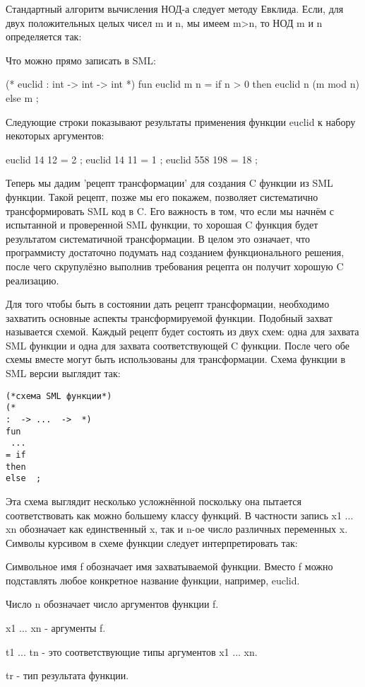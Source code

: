 Стандартный алгоритм вычисления НОД-а следует методу Евклида. Если, для двух положительных целых чисел m и n, мы имеем m>n, то НОД m и n определяется так:

Что можно прямо записать в SML:

(* euclid : int -> int -> int *)
fun euclid m n = if n > 0
then euclid n (m mod n)
else m ;

Следующие строки показывают результаты применения функции euclid к набору некоторых аргументов:

euclid 14 12
= 2 ;
euclid 14 11
= 1 ;
euclid 558 198 = 18 ;

Теперь мы дадим 'рецепт трансформации' для создания C функции из SML функции. Такой рецепт, позже мы его покажем, позволяет систематично трансформировать SML код в C. Его важность в том, что если мы начнём с испытанной и проверенной SML функции, то хорошая C функция будет результатом систематичной трансформации. В целом это означает, что программисту достаточно подумать над созданием функционального решения, после чего скрупулёзно выполнив требования рецепта он получит хорошую C реализацию. 

Для того чтобы быть в состоянии дать рецепт трансформации, необходимо захватить основные аспекты трансформируемой функции. Подобный захват называется схемой. Каждый рецепт будет состоять из двух схем: одна для захвата SML функции и одна для захвата соответствующей C функции. После чего обе схемы вместе могут быть использованы для трансформации. Схема функции в SML версии выглядит так:

\begin{lstlisting}
(*схема SML функции*)
(*
:  -> ...  ->  *)
fun 
 ... 
= if 
then
else  ;
\end{lstlisting}

Эта схема выглядит несколько усложнённой поскольку она пытается соответствовать как можно большему классу функций. В частности запись x1 ... xn обозначает как единственный x, так и n-ое число различных переменных x. Символы курсивом в схеме функции следует интерпретировать так:

Символьное имя f обозначает имя захватываемой функции. Вместо f можно подставлять любое конкретное название функции, например, euclid.

Число n обозначает число аргументов функции f.

x1 ... xn - аргументы f.

t1 ... tn - это соответствующие типы аргументов x1 ... xn.

tr - тип результата функции.

